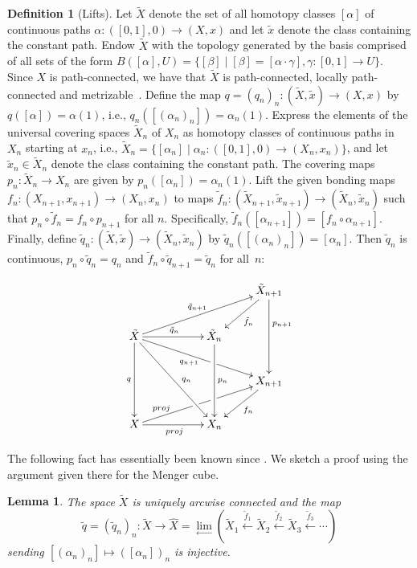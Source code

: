 \documentclass{amsart}
\newtheorem{lemma}[theorem]{Lemma}
\theoremstyle{definition}
\newtheorem{definition}[theorem]{Definition}
\theoremstyle{remark}
\numberwithin{equation}{section}
\begin{document}
\begin{definition}[Lifts] \label{lifts} Let $\tilde{X}$ denote the set of all homotopy classes $[\alpha]$ of continuous paths $\alpha:([0,1],0)\rightarrow (X,x)$ and let $\tilde{x}$ denote the class containing the constant path. Endow $\tilde{X}$ with the topology generated by the basis comprised of all sets of the form $B([\alpha],U)=\{[\beta]\mid [\beta]=[\alpha\cdot \gamma], \gamma:[0,1]\rightarrow U\}$. Since $X$ is path-connected, we have that  $\tilde{X}$ is path-connected, locally path-connected and metrizable~\cite{FZ2}. Define the map
 $q=(q_n)_n:(\tilde{X},\tilde{x})\rightarrow (X,x)$ by $q([\alpha])=\alpha(1)$, i.e., $q_n([(\alpha_n)_n])=\alpha_n(1)$. Express the elements of the universal covering spaces  $\tilde{X}_n$ of $X_n$ as homotopy classes of continuous paths in $X_n$ starting at $x_n$, i.e., $\tilde{X}_n=\{[\alpha_n]\mid\alpha_n:([0,1],0)\rightarrow (X_n,x_n)\}$,  and let $\tilde{x}_n\in \tilde{X}_n$ denote the class containing the constant path. The covering maps $p_n:\tilde{X}_n\rightarrow X_n$ are given by $p_n([\alpha_n])=\alpha_n(1)$. Lift the given bonding maps $f_n:(X_{n+1},x_{n+1})\rightarrow (X_n,x_n)$ to maps $\tilde{f}_n:(\tilde{X}_{n+1},\tilde{x}_{n+1})\rightarrow (\tilde{X}_n,\tilde{x}_n)$ such that $p_n\circ\tilde{f}_n
=f_n\circ p_{n+1}$ for all $n$. Specifically, $\tilde{f}_n([\alpha_{n+1}])=[f_n\circ \alpha_{n+1}]$. Finally, define $\tilde{q}_n:(\tilde{X},\tilde{x})\rightarrow (\tilde{X}_n,\tilde{x}_n)$ by $\tilde{q}_n([(\alpha_n)_n])=[\alpha_n]$. Then $\tilde{q}_n$ is continuous, $p_n\circ \tilde{q}_n=q_n$ and $\tilde{f}_n\circ \tilde{q}_{n+1}=\tilde{q}_n$ for all~$n$:
\vspace{-12pt}

\[
\xymatrix{  & & & \tilde{X}_{n+1} \ar[dd]^<(.3){p_{n+1}} \ar[dl]^{\tilde{f}_n}\\
\tilde{X}\ar[ddrr]^(.55){q_n} \ar[drrr]_<(.4){q_{n+1}}|<(.56){\hole} \ar[dd]_<(.45){q} \ar[rr]^{\tilde{q}_n } \ar[rrru]^{\tilde{q}_{n+1}}& & \tilde{X}_n \ar[dd]^<(.45){p_n}& \\
& &  & X_{n+1} \ar[dl]^{f_n}\\
X \ar[rrru]^<<<<<<<<{proj}|<(.42){\hole}|<(.56){\hole} \ar[rr]_{proj}& &  X_n & }
\]

\end{definition}

The following fact has essentially been known since \cite{CF1}. We sketch a proof using the argument given there for the Menger cube.

\begin{lemma}\label{CurtisFort} The space $\tilde{X}$ is uniquely arcwise connected and
the map \[\tilde{q}=(\tilde{q}_n)_n:\tilde{X}\rightarrow \hat{X}=\lim_{\longleftarrow} \left(\tilde{X}_1\stackrel{\tilde{f}_1}{\longleftarrow} \tilde{X}_2 \stackrel{\tilde{f}_2}{\longleftarrow} \tilde{X}_3 \stackrel{\tilde{f}_3}{\longleftarrow} \cdots\right)\] sending $[(\alpha_n)_n]\mapsto ([\alpha_n])_n$ is injective.
\end{lemma}
\end{document}

